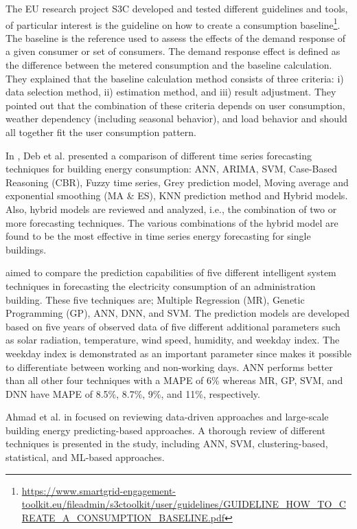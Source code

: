 The EU research project S3C developed and tested different guidelines and tools, of particular interest is the guideline on how to create a consumption baseline\footnote{ \url{https://www.smartgrid-engagement-toolkit.eu/fileadmin/s3ctoolkit/user/guidelines/GUIDELINE_HOW_TO_CREATE_A_CONSUMPTION_BASELINE.pdf} }.
The baseline is the reference used to assess the effects of the demand response of a given consumer or set of consumers.
The demand response effect is defined as the difference between the metered consumption and the baseline calculation.
They explained that the baseline calculation method consists of three criteria:
i) data selection method,
ii) estimation method,
and iii) result adjustment.
They pointed out that the combination of these criteria depends on user consumption, weather dependency (including seasonal behavior), and load behavior and should all together fit the user consumption pattern.

In \cite{DEB2017902}, Deb et al. presented a comparison of different time series forecasting techniques for building energy consumption: ANN, ARIMA, SVM, Case-Based Reasoning (CBR), Fuzzy time series, Grey prediction model, Moving average and exponential smoothing (MA \& ES), KNN prediction method and Hybrid models.
Also, hybrid models are reviewed and analyzed, i.e., the combination of two or more forecasting techniques.
The various combinations of the hybrid model are found to be the most effective in time series energy forecasting for single buildings.

\cite{AMBER2018886} aimed to compare the prediction capabilities of five different intelligent system techniques in forecasting the electricity consumption of an administration building.
These five techniques are; Multiple Regression (MR), Genetic Programming (GP), ANN, DNN, and SVM.
The prediction models are developed based on five years of observed data of five different additional parameters such as solar radiation, temperature, wind speed, humidity, and weekday index.
The weekday index is demonstrated as an important parameter since makes it possible to differentiate between working and non-working days.
ANN performs better than all other four techniques with a MAPE of 6\% whereas MR, GP, SVM, and DNN have MAPE of 8.5\%, 8.7\%, 9\%, and 11\%, respectively.

Ahmad et al. in \cite{AHMAD2018301} focused on reviewing data-driven approaches and large-scale building energy predicting-based approaches.
A thorough review of different techniques is presented in the study, including ANN, SVM, clustering-based, statistical, and ML-based approaches.

